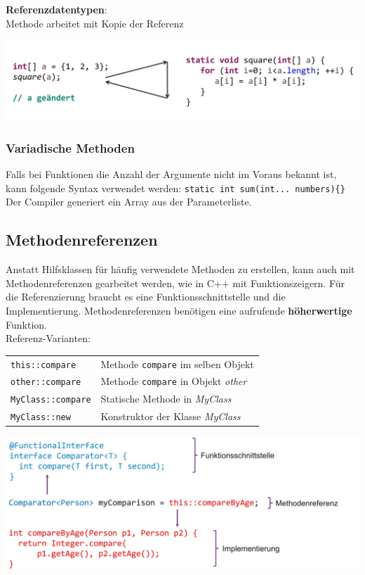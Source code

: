 \textbf{Referenzdatentypen}:\\
Methode arbeitet mit Kopie der Referenz
\begin{center}
    \includegraphics[width=0.9\columnwidth]{pictures/reference-params.png}    
\end{center}

\subsubsection{Variadische Methoden}
Falls bei Funktionen die Anzahl der Argumente nicht im Voraus bekannt ist, kann folgende
Syntax verwendet werden: \verb|static int sum(int... numbers){}|\\
Der Compiler generiert ein Array aus der Parameterliste.

\subsection{Methodenreferenzen}
Anstatt Hilfsklassen für häufig verwendete Methoden zu erstellen, kann auch mit 
Methodenreferenzen gearbeitet werden, wie in C++ mit Funktionszeigern. Für die Referenzierung braucht es
eine Funktionsschnittstelle und die Implementierung. Methodenreferenzen benötigen eine aufrufende \textbf{höherwertige} Funktion. \\
Referenz-Varianten:\\
\begin{tabular}{ll}
    \verb|this::compare|    & Methode \verb|compare| im selben Objekt \\
    \verb|other::compare|   & Methode \verb|compare| in Objekt \textit{other} \\
    \verb|MyClass::compare| & Statische Methode in \textit{MyClass} \\
    \verb|MyClass::new|     & Konstruktor der Klasse \textit{MyClass} \\
\end{tabular}

\includegraphics[width=\linewidth]{pictures/methoden-referenzen.jpg}


